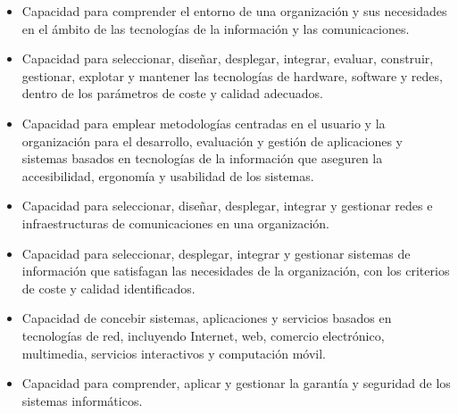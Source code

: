 \documentclass[a4paper]{article}
\newcommand\liststyleLx{%
\renewcommand\labelitemi{{\textbullet}}
\renewcommand\labelitemii{{\textbullet}}
\renewcommand\labelitemiii{{\textbullet}}
\renewcommand\labelitemiv{{\textbullet}}
}
\begin{document}
\liststyleLx
\begin{itemize}
\item Capacidad para comprender el entorno de una organizaci\'on y sus necesidades en el \'ambito de las tecnolog\'ias
de la informaci\'on y las comunicaciones.
\item Capacidad para seleccionar, dise\~nar, desplegar, integrar, evaluar, construir, gestionar, explotar y mantener las
tecnolog\'ias de hardware, software y redes, dentro de los par\'ametros de coste y calidad adecuados.
\item Capacidad para emplear metodolog\'ias centradas en el usuario y la organizaci\'on para el desarrollo, evaluaci\'on
y gesti\'on de aplicaciones y sistemas basados en tecnolog\'ias de la informaci\'on que aseguren la accesibilidad,
ergonom\'ia y usabilidad de los sistemas.
\item Capacidad para seleccionar, dise\~nar, desplegar, integrar y gestionar redes e infraestructuras de comunicaciones
en una organizaci\'on.
\item Capacidad para seleccionar, desplegar, integrar y gestionar sistemas de informaci\'on que satisfagan las
necesidades de la organizaci\'on, con los criterios de coste y calidad identificados.
\item Capacidad de concebir sistemas, aplicaciones y servicios basados en tecnolog\'ias de red, incluyendo Internet,
web, comercio electr\'onico, multimedia, servicios interactivos y computaci\'on m\'ovil.
\item Capacidad para comprender, aplicar y gestionar la garant\'ia y seguridad de los sistemas inform\'aticos.
\end{itemize}

\bigskip
\end{document}

